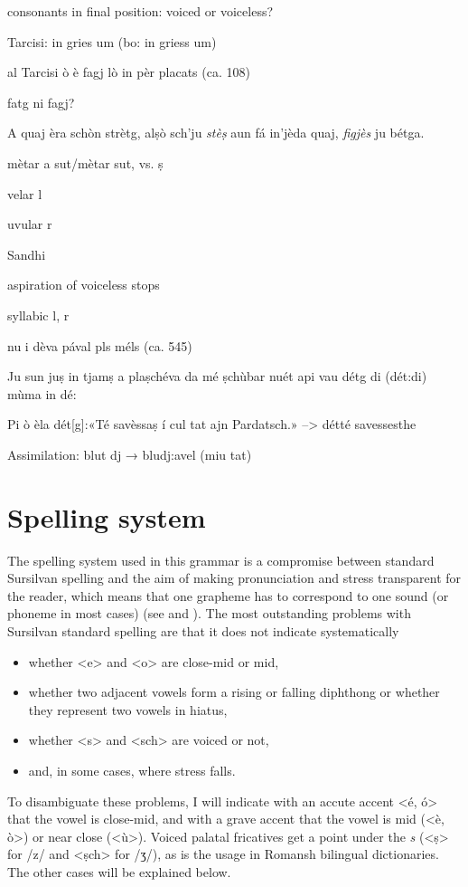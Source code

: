 consonants in final position: voiced or voiceless?

Tarcisi: in gries um (bo: in griess um)

al Tarcisi ò è fagj lò in pèr placats (ca. 108)

fatg ni fagj?

A quaj èra schòn strètg, alṣò sch'ju \textit{stèṣ} aun fá in'jèda quaj, \textit{figjès} ju bétga.

mètar a sut/mètar sut, vs. ṣ

velar l

uvular r


Sandhi

aspiration of voiceless stops

syllabic l, r

nu i dèva pával pls méls (ca. 545)


Ju sun juṣ in tjamṣ a plaṣchéva da mé ṣchùbar nuét api vau détg di (dét:di) mùma in dé:

Pi ò èla dét[g]:«Té savèssaṣ í cul tat ajn Pardatsch.» --> détté savessesthe 

Assimilation: blut dj → bludj:avel (miu tat)

\section{Spelling system}

The spelling system used in this grammar is a compromise between standard Sursilvan spelling and the aim of making pronunciation and stress transparent for the reader, which means that one grapheme has to correspond to one sound (or phoneme in most cases) (see  and ). The most outstanding problems with Sursilvan standard spelling are that it does not indicate systematically

\begin{itemize}
\item whether <e> and <o> are close-mid or mid, 
\item whether two adjacent vowels form a rising or falling diphthong or whether they represent two vowels in hiatus,
\item whether <s> and <sch> are voiced or not, 
\item and, in some cases, where stress falls.
\end{itemize}
 
To disambiguate these problems, I will indicate with an accute accent <é, ó> that the vowel is close-mid, and with a grave accent that the vowel is mid (<è, ò>) or near close (<ù>). Voiced palatal fricatives get a point under the \textit{s} (<ṣ> for /z/ and <ṣch> for /ʒ/), as is the usage in Romansh bilingual dictionaries. The other cases will be explained below.

